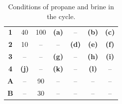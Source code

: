 \documentclass[calculator,steamtables,refrigeranttables,psychrometricchart,datasheet,solutions]{exam}
\begin{document}
\begin{question}
\begin{enumerate}[(a)]
\begin{table}[h]
\begin{center}
\begin{tabular} {||c | c c c c c c || }
\hline\hline
 {\bf 1 }   & 40         & 100            &   {\bf (a)}    &    --               & {\bf (b)}           & {\bf (c)}                \\
 {\bf 2 }   & 10         &  --            &   --           & {\bf (d)}           & {\bf (e)}           & {\bf (f)}                 \\
 {\bf 3 }   & --         & --             &   {\bf (g)}    & --                  & {\bf (h)}           & {\bf (i)}                \\
 {\bf 4 }   & {\bf (j)}  & --             &   {\bf (k)}    & --                  & {\bf (l)}           & --                      \\
 {\bf A }   & --         & 90             &   --           & --                  & --                  & --                       \\
 {\bf B }   & --         & 30             &   --           & --                  & --                  & --                       \\
 \hline\hline
\end{tabular}
\end{center}
\caption{Conditions of propane and brine in the cycle.}
\end{table}


\end{enumerate}
\end{question}
\end{document}
